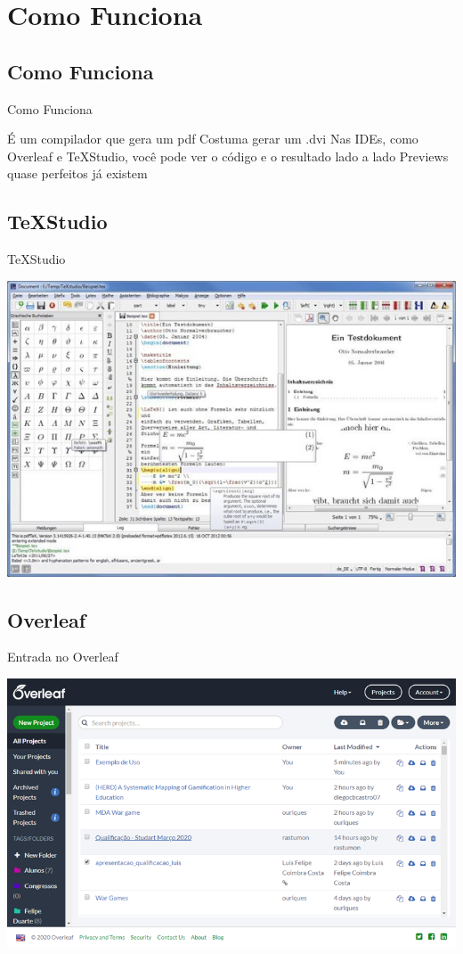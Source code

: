 \documentclass{beamer}
\begin{document}
\section{Como Funciona}
\subsection{Como Funciona}
\begin{frame}{Como Funciona}
\begin{outline}%
  \1 É um compilador que gera um pdf
   \2 Costuma gerar um .dvi
   \1 Nas IDEs, como Overleaf e \TeX Studio, você pode ver o código e o resultado lado a lado
   \1 Previews quase perfeitos já existem
\end{outline}
\end{frame}

\subsection{\TeX  Studio}
\begin{frame}{\TeX  Studio}
\begin{center}
    \includegraphics[width=0.8\linewidth]{Images/Picture1.jpg}
\end{center}
\end{frame} 

   
\subsection{Overleaf}
\begin{frame}{Entrada no Overleaf}
\begin{center}
    \includegraphics[width=\linewidth]{Images/Picture2.png}
\end{center}    
\end{frame}
\end{document}
